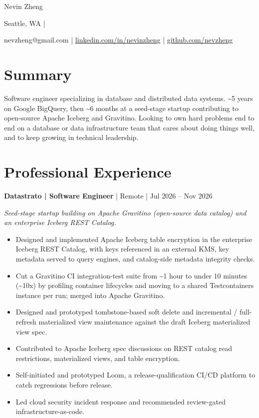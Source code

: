 \documentclass[letterpaper,11pt]{article}
\newif\ifshowphone
\newcommand{\job}[4]{%
  \vspace{4pt}\textbf{#1 | #2} | #3 | #4\par\vspace{3pt}}
\newcommand{\subline}[1]{\textit{#1}\par}
\newcommand{\weblink}[2]{\href{#1}{\color{link}\underline{#2}}}
\begin{document}
{\fontsize{24}{28}\selectfont Nevin Zheng}\par\vspace{4pt}
{\small Seattle, WA |
 \ifshowphone +1 781-664-7521 | \fi
 nevzheng@gmail.com |
 \weblink{https://linkedin.com/in/nevinzheng}{linkedin.com/in/nevinzheng} |
 \weblink{https://github.com/nevzheng}{github.com/nevzheng}}\par

\section{Summary}
Software engineer specializing in database and distributed data systems. \textasciitilde5 years on Google BigQuery, then \textasciitilde6 months at a seed-stage startup contributing to open-source Apache Iceberg and Gravitino. Looking to own hard problems end to end on a database or data infrastructure team that cares about doing things well, and to keep growing in technical leadership.\par

\section{Professional Experience}

\job{Datastrato}{Software Engineer}{Remote}{Jul 2026 -- Nov 2026}
\subline{Seed-stage startup building on Apache Gravitino (open-source data catalog) and an enterprise Iceberg REST Catalog.}
\begin{itemize}
  \item Designed and implemented Apache Iceberg table encryption in the enterprise Iceberg REST Catalog, with keys referenced in an external KMS, key metadata served to query engines, and catalog-side metadata integrity checks.
  \item Cut a Gravitino CI integration-test suite from \textasciitilde1 hour to under 10 minutes (\textasciitilde10x) by profiling container lifecycles and moving to a shared Testcontainers instance per run; merged into Apache Gravitino.
  \item Designed and prototyped tombstone-based soft delete and incremental / full-refresh materialized view maintenance against the draft Iceberg materialized view spec.
  \item Contributed to Apache Iceberg spec discussions on REST catalog read restrictions, materialized views, and table encryption.
  \item Self-initiated and prototyped Loom, a release-qualification CI/CD platform to catch regressions before release.
  \item Led cloud security incident response and recommended review-gated infrastructure-as-code.
\end{itemize}
\end{document}
